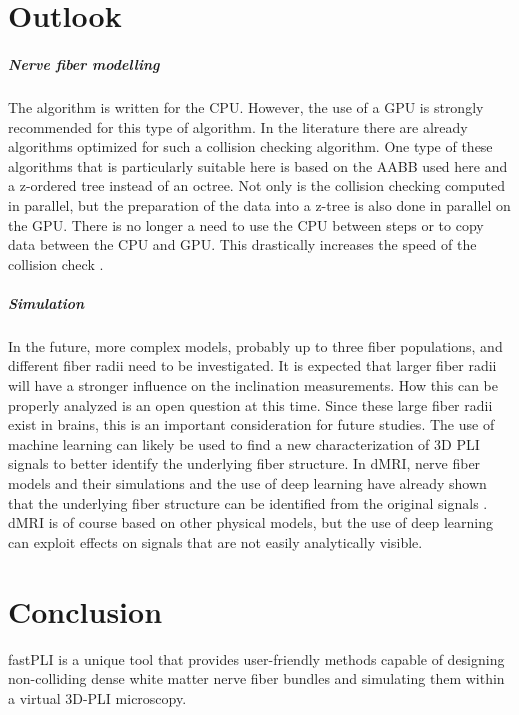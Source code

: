 \setcounter{chapter}{8}
\chapter{Outlook}
\label{sec:outlook}
% 
% 
\paragraph{Nerve fiber modelling}
% 
The algorithm is written for the \ac{CPU}.
However, the use of a \ac{GPU} is strongly recommended for this type of algorithm.
In the literature there are already algorithms optimized for such a collision checking algorithm.
One type of these algorithms that is particularly suitable here is based on the \ac{AABB} used here and a z-ordered tree instead of an octree.
Not only is the collision checking computed in parallel, but the preparation of the data into a z-tree is also done in parallel on the \ac{GPU}.
There is no longer a need to use the \ac{CPU} between steps or to copy data between the \ac{CPU} and \ac{GPU}.
This drastically increases the speed of the collision check \cite{Karras2012}. 
% 
% 
% 
\paragraph{Simulation}
% 
In the future, more complex models, probably up to three fiber populations, and different fiber radii need to be investigated.
It is expected that larger fiber radii will have a stronger influence on the inclination measurements.
How this can be properly analyzed is an open question at this time.
Since these large fiber radii exist in brains, this is an important consideration for future studies.
The use of machine learning can likely be used to find a new characterization of 3D PLI signals to better identify the underlying fiber structure.
In \ac{dMRI}, nerve fiber models and their simulations and the use of deep learning have already shown that the underlying fiber structure can be identified from the original signals \cite{ginsburgerDis2019}.
\ac{dMRI} is of course based on other physical models, but the use of deep learning can exploit effects on signals that are not easily analytically visible.
% 
% 
% 
% 
% 
\chapter{Conclusion}
\label{sec:conclusion}
% 
% 
\ac{fastPLI} is a unique tool that provides user-friendly methods capable of designing non-colliding dense white matter nerve fiber bundles and simulating them within a virtual \ac{3D-PLI} microscopy.
% 
% 
% 
